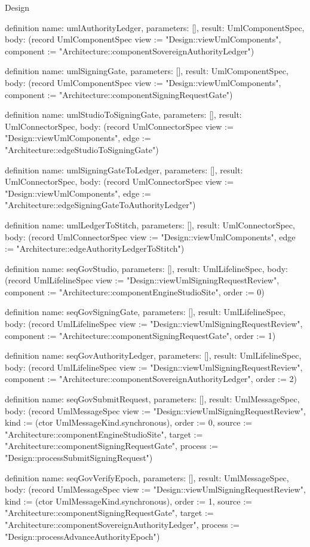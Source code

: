 \begin{lexlean}{Design}
\begin{semanticmodule}
definition{
  name: umlAuthorityLedger,
  parameters: [],
  result: UmlComponentSpec,
  body: (record UmlComponentSpec {view := "Design::viewUmlComponents", component := "Architecture::componentSovereignAuthorityLedger"})
}

definition{
  name: umlSigningGate,
  parameters: [],
  result: UmlComponentSpec,
  body: (record UmlComponentSpec {view := "Design::viewUmlComponents", component := "Architecture::componentSigningRequestGate"})
}

definition{
  name: umlStudioToSigningGate,
  parameters: [],
  result: UmlConnectorSpec,
  body: (record UmlConnectorSpec {view := "Design::viewUmlComponents", edge := "Architecture::edgeStudioToSigningGate"})
}

definition{
  name: umlSigningGateToLedger,
  parameters: [],
  result: UmlConnectorSpec,
  body: (record UmlConnectorSpec {view := "Design::viewUmlComponents", edge := "Architecture::edgeSigningGateToAuthorityLedger"})
}

definition{
  name: umlLedgerToStitch,
  parameters: [],
  result: UmlConnectorSpec,
  body: (record UmlConnectorSpec {view := "Design::viewUmlComponents", edge := "Architecture::edgeAuthorityLedgerToStitch"})
}

definition{
  name: seqGovStudio,
  parameters: [],
  result: UmlLifelineSpec,
  body: (record UmlLifelineSpec {view := "Design::viewUmlSigningRequestReview", component := "Architecture::componentEngineStudioSite", order := 0})
}

definition{
  name: seqGovSigningGate,
  parameters: [],
  result: UmlLifelineSpec,
  body: (record UmlLifelineSpec {view := "Design::viewUmlSigningRequestReview", component := "Architecture::componentSigningRequestGate", order := 1})
}

definition{
  name: seqGovAuthorityLedger,
  parameters: [],
  result: UmlLifelineSpec,
  body: (record UmlLifelineSpec {view := "Design::viewUmlSigningRequestReview", component := "Architecture::componentSovereignAuthorityLedger", order := 2})
}

definition{
  name: seqGovSubmitRequest,
  parameters: [],
  result: UmlMessageSpec,
  body: (record UmlMessageSpec {view := "Design::viewUmlSigningRequestReview", kind := (ctor UmlMessageKind.synchronous), order := 0, source := "Architecture::componentEngineStudioSite", target := "Architecture::componentSigningRequestGate", process := "Design::processSubmitSigningRequest"})
}

definition{
  name: seqGovVerifyEpoch,
  parameters: [],
  result: UmlMessageSpec,
  body: (record UmlMessageSpec {view := "Design::viewUmlSigningRequestReview", kind := (ctor UmlMessageKind.synchronous), order := 1, source := "Architecture::componentSigningRequestGate", target := "Architecture::componentSovereignAuthorityLedger", process := "Design::processAdvanceAuthorityEpoch"})
}


\end{semanticmodule}
\end{lexlean}
